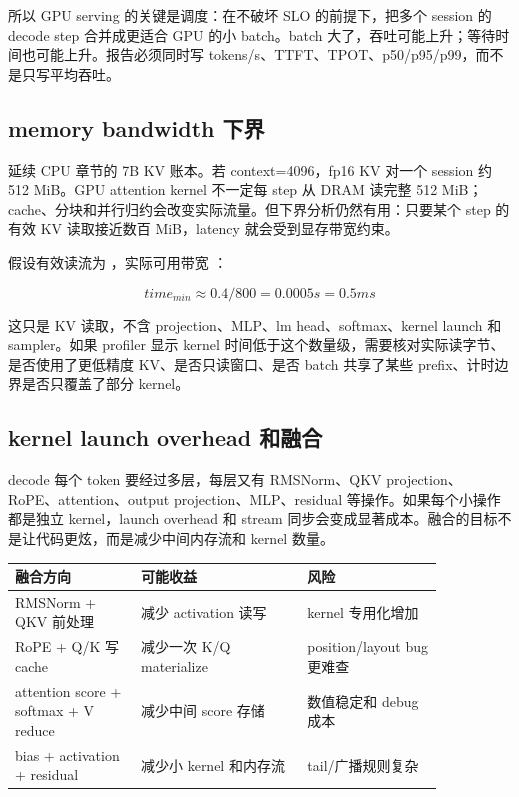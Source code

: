 所以 GPU serving 的关键是调度：在不破坏 SLO 的前提下，把多个 session 的 decode step 合并成更适合 GPU 的小 batch。batch 大了，吞吐可能上升；等待时间也可能上升。报告必须同时写 tokens/s、TTFT、TPOT、p50/p95/p99，而不是只写平均吞吐。

\subsection{memory bandwidth 下界}

延续 CPU 章节的 7B KV 账本。若 context=4096，fp16 KV 对一个 session 约 512 MiB。GPU attention kernel 不一定每 step 从 DRAM 读完整 512 MiB；cache、分块和并行归约会改变实际流量。但下界分析仍然有用：只要某个 step 的有效 KV 读取接近数百 MiB，latency 就会受到显存带宽约束。

假设有效读流为 ，实际可用带宽 ：

\[
time_{min} \approx 0.4 / 800 = 0.0005s = 0.5ms
\]

这只是 KV 读取，不含 projection、MLP、lm head、softmax、kernel launch 和 sampler。如果 profiler 显示 kernel 时间低于这个数量级，需要核对实际读字节、是否使用了更低精度 KV、是否只读窗口、是否 batch 共享了某些 prefix、计时边界是否只覆盖了部分 kernel。

\subsection{kernel launch overhead 和融合}

decode 每个 token 要经过多层，每层又有 RMSNorm、QKV projection、RoPE、attention、output projection、MLP、residual 等操作。如果每个小操作都是独立 kernel，launch overhead 和 stream 同步会变成显著成本。融合的目标不是让代码更炫，而是减少中间内存流和 kernel 数量。

\begin{center}
\begin{tabular}{p{0.25\linewidth}p{0.33\linewidth}p{0.27\linewidth}}
\toprule
融合方向 & 可能收益 & 风险 \\
\midrule
RMSNorm + QKV 前处理 & 减少 activation 读写 & kernel 专用化增加 \\
RoPE + Q/K 写 cache & 减少一次 K/Q materialize & position/layout bug 更难查 \\
attention score + softmax + V reduce & 减少中间 score 存储 & 数值稳定和 debug 成本 \\
bias + activation + residual & 减少小 kernel 和内存流 & tail/广播规则复杂 \\
\bottomrule
\end{tabular}
\end{center}

